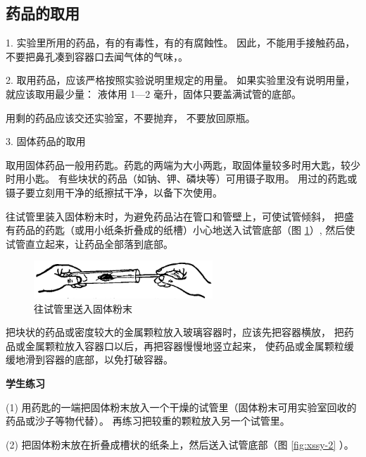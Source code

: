 \label{sec:xssy-caozuo}

\subsection{药品的取用}

1. 实验里所用的药品，有的有毒性，有的有腐蝕性。
因此，不能用手接触药品，不要把鼻孔凑到容器口去闻气体的气味，。

2. 取用药品，应该严格按照实验说明里规定的用量。
如果实验里没有说明用量，就应该取用最少量：
液体用 1—2 毫升，固体只要盖满试管的底部。

用剩的药品应该交还实验室，不要抛弃， 不要放回原瓶。

3. 固体药品的取用

取用固体药品一般用药匙。药匙的两端为大小两匙，取固体量较多时用大匙，较少时用小匙。
有些块状的药品（如钠、钾、磷块等）可用镊子取用。
用过的药匙或镊子要立刻用干净的纸擦拭干净，以备下次使用。

往试管里装入固体粉末时，为避免药品沾在管口和管壁上，可使试管倾斜，
把盛有药品的药匙（或用小纸条折叠成的纸槽）小心地送入试管底部（图 \ref{fig:xssy-1}）,
然后使试管直立起来，让药品全部落到底部。

\begin{figure}[htbp]
    \centering
    \includegraphics[width=0.6\textwidth]{../pic/czhx1-xssy-01}
    \caption{往试管里送入固体粉末}\label{fig:xssy-1}
\end{figure}

把块状的药品或密度较大的金属颗粒放入玻璃容器时，应该先把容器横放，
把药品或金属颗粒放入容器口以后，再把容器慢慢地竖立起来，
使药品或金属颗粒缓缓地滑到容器的底部，以免打破容器。

\textbf{学生练习}

(1) 用药匙的一端把固体粉末放入一个干燥的试管里（固体粉末可用实验室回收的药品或沙子等物代替）。
再练习把较重的颗粒放入另一个试管里。

(2) 把固体粉末放在折叠成槽状的纸条上，然后送入试管底部（图 \ref{fig:xssy-2} ）。


